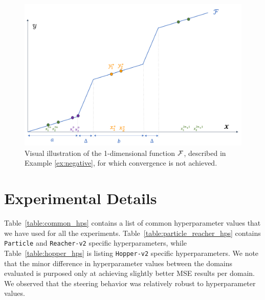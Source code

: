 \documentclass[nohyperref]{article}
\begin{document}
\begin{figure}[]
    \centering
    \includegraphics[width=0.8\linewidth,keepaspectratio]{figures/iclr_plots/negative_example.png}
    \vspace{-1em}
    \caption{Visual illustration of the 1-dimensional function $\mathcal{F}$, described in Example \ref{ex:negative}, for which convergence is not achieved. }
    \label{fig:negative_example}
    \vspace{-0.5em}
\end{figure}

\newpage



\section{Experimental Details}
Table~\ref{table:common_hps} contains a list of common hyperparameter values that we have used for all the experiments. Table~\ref{table:particle_reacher_hps} contains \texttt{Particle} and \texttt{Reacher-v2} specific hyperparameters, while Table~\ref{table:hopper_hps} is listing \texttt{Hopper-v2} specific hyperparameters. We note that the minor difference in hyperparameter values between the domains evaluated is purposed only at achieving slightly better MSE results per domain. We observed that the steering behavior was relatively robust to hyperparameter values.
\end{document}
